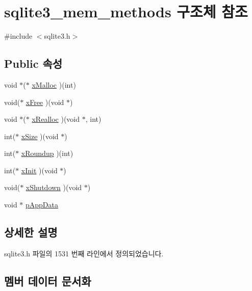\hypertarget{structsqlite3__mem__methods}{}\section{sqlite3\+\_\+mem\+\_\+methods 구조체 참조}
\label{structsqlite3__mem__methods}


{\ttfamily \#include $<$sqlite3.\+h$>$}

\subsection*{Public 속성}
\begin{DoxyCompactItemize}
\item 
void $\ast$($\ast$ \hyperlink{structsqlite3__mem__methods_a19aee06ad5c1c7041f55725b6adb2b18}{x\+Malloc} )(int)
\item 
void($\ast$ \hyperlink{structsqlite3__mem__methods_a17d4fe3177f86bd7b559ecadaa343ee8}{x\+Free} )(void $\ast$)
\item 
void $\ast$($\ast$ \hyperlink{structsqlite3__mem__methods_a82ef8b50d6b9920c1dadb3257cf36a3a}{x\+Realloc} )(void $\ast$, int)
\item 
int($\ast$ \hyperlink{structsqlite3__mem__methods_a703ec736e9ce21fd43b9602bcd07fa8e}{x\+Size} )(void $\ast$)
\item 
int($\ast$ \hyperlink{structsqlite3__mem__methods_aaf22c6bca12dc6a3f5851e2b6b59835d}{x\+Roundup} )(int)
\item 
int($\ast$ \hyperlink{structsqlite3__mem__methods_a870eddbe27d9062ed2fb49ba13233501}{x\+Init} )(void $\ast$)
\item 
void($\ast$ \hyperlink{structsqlite3__mem__methods_ae3b1f92553e714484515409eefec5c2f}{x\+Shutdown} )(void $\ast$)
\item 
void $\ast$ \hyperlink{structsqlite3__mem__methods_a390f66d08d5a480544e919f64d7713de}{p\+App\+Data}
\end{DoxyCompactItemize}


\subsection{상세한 설명}


sqlite3.\+h 파일의 1531 번째 라인에서 정의되었습니다.



\subsection{멤버 데이터 문서화}
\mbox{\label{structsqlite3__mem__methods_a390f66d08d5a480544e919f64d7713de}} 
